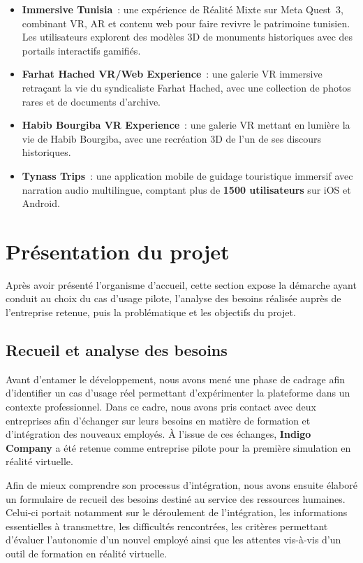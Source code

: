 \begin{itemize}
  \item \textbf{Immersive Tunisia}~: une expérience de Réalité Mixte sur Meta Quest~3,
    combinant VR, AR et contenu web pour faire revivre le patrimoine tunisien. Les utilisateurs
    explorent des modèles 3D de monuments historiques avec des portails interactifs gamifiés.

  \item \textbf{Farhat Hached VR/Web Experience}~: une galerie VR immersive retraçant la vie
    du syndicaliste Farhat Hached, avec une collection de photos rares et de documents d'archive.

  \item \textbf{Habib Bourgiba VR Experience}~: une galerie VR mettant en lumière la vie de
    Habib Bourgiba, avec une recréation 3D de l'un de ses discours historiques.

  \item \textbf{Tynass Trips}~: une application mobile de guidage touristique immersif avec
    narration audio multilingue, comptant plus de \textbf{1500 utilisateurs} sur iOS et Android.
\end{itemize}

\section{Présentation du projet}

Après avoir présenté l'organisme d'accueil, cette section expose la démarche ayant
conduit au choix du cas d'usage pilote, l'analyse des besoins réalisée auprès de
l'entreprise retenue, puis la problématique et les objectifs du projet.

\subsection{Recueil et analyse des besoins}

Avant d'entamer le développement, nous avons mené une phase de cadrage afin
d'identifier un cas d'usage réel permettant d'expérimenter la plateforme dans un
contexte professionnel. Dans ce cadre, nous avons pris contact avec deux entreprises
afin d'échanger sur leurs besoins en matière de formation et d'intégration des
nouveaux employés. À l'issue de ces échanges, \textbf{Indigo Company} a été retenue
comme entreprise pilote pour la première simulation en réalité virtuelle.

Afin de mieux comprendre son processus d'intégration, nous avons ensuite élaboré
un formulaire de recueil des besoins destiné au service des ressources humaines.
Celui-ci portait notamment sur le déroulement de l'intégration, les informations
essentielles à transmettre, les difficultés rencontrées, les critères permettant
d'évaluer l'autonomie d'un nouvel employé ainsi que les attentes vis-à-vis d'un
outil de formation en réalité virtuelle.

